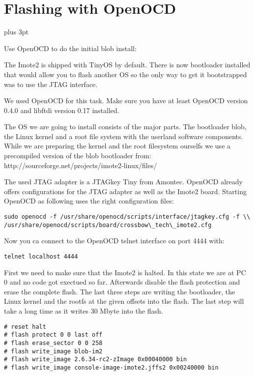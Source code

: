 \chapter{Flashing with OpenOCD}
\label{annexopenocd}
\parindent=0pt                   %
\parskip=6pt plus 3pt            %

Use OpenOCD to do the initial blob install:

The Imote2 is shipped with TinyOS by default. There is now bootloader installed
that would allow you to flash another OS so the only way to get it bootstrapped
was to use the JTAG interface.

We used OpenOCD for this task. Make sure you have at least OpenOCD version 0.4.0
and libftdi version 0.17 installed.

The OS we are going to install consists of the major parts. The bootloader blob, the
Linux kernel and a root file system with the userland software components. While
we are preparing the kernel and the root filesystem ourselfs we use a
precompiled version of the blob bootloader from:
http://sourceforge.net/projects/imote2-linux/files/

The used JTAG adapter is a JTAGkey Tiny from Amontec. OpenOCD already offers
configurations for the JTAG adapter as well as the Imote2 board. Starting
OpenOCD as following uses the right configuration files:

\begin{verbatim}
sudo openocd -f /usr/share/openocd/scripts/interface/jtagkey.cfg -f \\
/usr/share/openocd/scripts/board/crossbow\_tech\_imote2.cfg
\end{verbatim}

Now you ca connect to the OpenOCD telnet interface on port 4444 with:

\begin{verbatim}
telnet localhost 4444
\end{verbatim}

First we need to make sure that the Imote2 is halted. In this state we are at PC
0 and no code got exectued so far. Afterwards disable the flash protection and
erase the complete flash. The last three steps are writing the bootloader, the
Linux kernel and the rootfs at the given offsets into the flash. The last step
will take a long time as it writes 30 Mbyte into the flash.

\begin{verbatim}
# reset halt
# flash protect 0 0 last off
# flash erase_sector 0 0 258
# flash write_image blob-im2
# flash write_image 2.6.34-rc2-zImage 0x00040000 bin
# flash write_image console-image-imote2.jffs2 0x00240000 bin
\end{verbatim}
